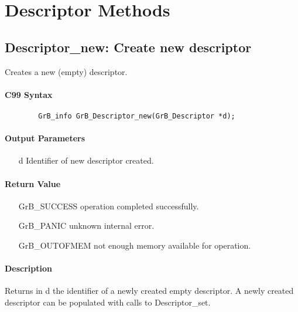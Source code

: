 \section{Descriptor Methods}

\subsection{{\sf Descriptor\_new}: Create new descriptor}

Creates a new (empty) descriptor.

\paragraph{C99 Syntax}

\begin{verbatim}
        GrB_info GrB_Descriptor_new(GrB_Descriptor *d);
\end{verbatim}

\paragraph{Output Parameters}

\begin{itemize}[leftmargin=1.1in]
    \item[{\sf d}] Identifier of new descriptor created.
\end{itemize}

\paragraph{Return Value}

\begin{itemize}[leftmargin=2.1in]
\item[{\sf GrB\_SUCCESS}]           operation completed successfully.
\item[{\sf GrB\_PANIC}]             unknown internal error.
\item[{\sf GrB\_OUTOFMEM}]          not enough memory available for operation.
\end{itemize}

\paragraph{Description}

Returns in {\sf d} the identifier of a newly created empty descriptor.
A newly created descriptor can be populated with calls to {\sf
Descriptor\_set}.

